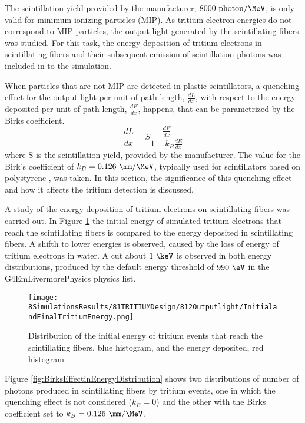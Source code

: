 The scintillation yield provided by the manufacturer, $8000~\text{photon}/\MeV$, is only valid for minimum ionizing particles (MIP). As tritium electron energies do not correspond to MIP particles, the output light generated by the scintillating fibers was studied. For this task, the energy deposition of tritium electrons in scintillating fibers and their subsequent emission of scintillation photons was included in to the simulation.

When particles that are not MIP are detected in plastic scintillators, a quenching effect for the output light per unit of path length, $\frac{dL}{dx}$, with respect to the energy deposited per unit of path length, $\frac{dE}{dx}$, happens, that can be parametrized by the Birks coefficient\cite{BirksPaper}.
\begin{equation}
\frac{dL}{dx}= S\frac{\displaystyle{\frac{dE}{dx}}}{1+k_B\displaystyle{\frac{dE}{dx}}}
\label{eq:birkscoefficient}
\end{equation}
where S is the scintillation yield, provided by the manufacturer. The value for the Birk's coefficient of $k_B=0.126~\mm/\MeV$, typically used for scintillators based on polystyrene \cite{BirksCoefficient}, was taken. In this section, the significance of this quenching effect and how it affects the tritium detection is discussed.

A study of the energy deposition of tritium electrons on scintillating fibers was carried out. In Figure \ref{fig:InitialFinalTritiumEnergy} the initial energy of simulated tritium electrons that reach the scintillating fibers is compared to the energy deposited in scintillating fibers. A shifth to lower energies is observed, caused by the loss of energy of tritium electrons in water. A cut about $1~\keV$ is observed in both energy distributions, produced by the default energy threshold of $990~\eV$ in the G4EmLivermorePhysics physics list.

\begin{figure}[h]
\centering
\texttt{[image: 8SimulationsResults/81TRITIUMDesign/812Outputlight/InitialandFinalTritiumEnergy.png]}
\caption{Distribution of the initial energy of tritium events that reach the scintillating fibers, blue histogram, and the energy deposited, red histogram \cite{SimulationPaperCarlos}.\label{fig:InitialFinalTritiumEnergy}}
\end{figure}

Figure \ref{fig:BirksEffectinEnergyDistribution} shows two distributions of number of photons produced in scintillating fibers by tritium events, one in which the quenching effect is not considered ($k_B=0$) and the other with the Birks coefficient set to $k_B=0.126~\mm/\MeV$.

